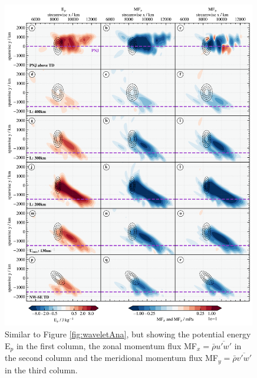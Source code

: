 \begin{figure}[tbp]
    \centering
    \includegraphics[width=0.99\textwidth]{figures_3D/waveletAna_mf.png}
    \caption{Similar to Figure \ref{fig:waveletAna}, but showing the potential energy E$_p$ in the first column, the zonal momentum flux MF$_x= \bar{\rho} \overbar{u'w'}$ in the second column and the meridional momentum flux MF$_y= \bar{\rho} \overbar{v'w'}$ in the third column.}
    \label{fig:waveletAna_mf}
\end{figure}
%
